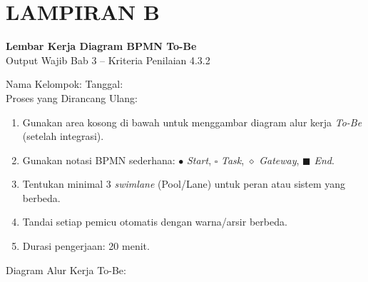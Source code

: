 \documentclass[12pt,a4paper]{report}
\begin{document}
\newpage
\section*{\color{plnblue} LAMPIRAN B}
{\Large\bfseries Lembar Kerja Diagram BPMN To-Be}\\[0.15cm]
{\normalsize\color{medgray}Output Wajib Bab 3 -- Kriteria Penilaian 4.3.2}

\vspace{0.4cm}

\noindent Nama Kelompok: \fillline[5cm] \quad Tanggal: \fillline[3cm]\\[0.25cm]
Proses yang Dirancang Ulang: \fillline[9cm]

\begin{wsinstruksibox}
\begin{enumerate}
    \item Gunakan area kosong di bawah untuk menggambar diagram alur kerja \textit{To-Be} (setelah integrasi).
    \item Gunakan notasi BPMN sederhana: $\bullet$ \textit{Start}, $\square$ \textit{Task}, $\diamond$ \textit{Gateway}, $\blacksquare$ \textit{End}.
    \item Tentukan minimal 3 \textit{swimlane} (Pool/Lane) untuk peran atau sistem yang berbeda.
    \item Tandai setiap pemicu otomatis dengan warna/arsir berbeda.
    \item Durasi pengerjaan: 20 menit.
\end{enumerate}
\end{wsinstruksibox}

\vspace{0.3cm}

\noindent Diagram Alur Kerja To-Be:
\vspace{0.3cm}
\end{document}
